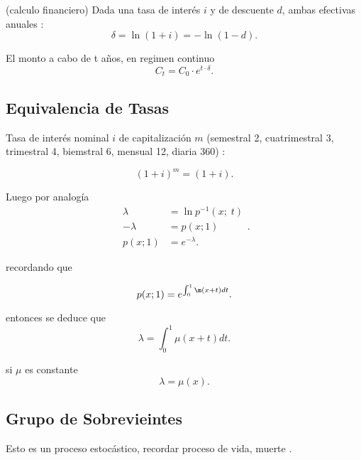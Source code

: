 (calculo financiero) Dada una tasa de interés  $i$ y de descuente $d$, ambas  {\color{red} efectivas anuales }:
\[
    \delta = \ln(1+i) = -\ln(1-d)
.\] 
    
El monto a cabo de t años, en regimen continuo 
\[
C_t = C_0 \cdot e^{t \cdot \delta}
.\] 


\subsection{ Equivalencia de Tasas }
Tasa de interés nominal $i$  de capitalización $m$ (semestral 2, cuatrimestral 3, trimestral 4, biemstral 6, mensual 12, diaria 360) :

\[
    (1+i)^{m} = (1+i)
.\] 



Luego por analogía
\[
    \begin{align*}
        \lambda  &= \ln p^{-1}(x;\;t) \\
        - \lambda &= p(x;1) \\[0.2cm] 
        p(x;1) &= e^{-\lambda}
    .\end{align*}
.\] 

recordando que 

\[
    p(x;1) = e^{\int_0^{1} \m(x + t)dt}
.\] 

entonces se deduce que 
\[
    \lambda = \int_0^{1} \mu(x+t)dt
.\] 

si $\mu$ es constante
\[
    \lambda = \mu(x)
.\] 



\subsection{ Grupo de Sobrevieintes } 

Esto es un proceso estocástico, recordar proceso de vida, muerte .











